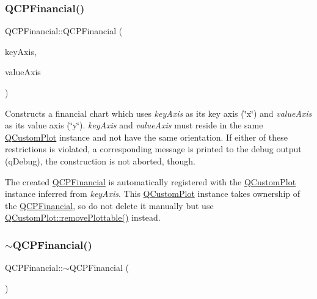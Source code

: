 \subsubsection{\texorpdfstring{Q\+C\+P\+Financial()}{QCPFinancial()}}
{\footnotesize\ttfamily Q\+C\+P\+Financial\+::\+Q\+C\+P\+Financial (\begin{DoxyParamCaption}\item[{\hyperlink{class_q_c_p_axis}{Q\+C\+P\+Axis} $\ast$}]{key\+Axis,  }\item[{\hyperlink{class_q_c_p_axis}{Q\+C\+P\+Axis} $\ast$}]{value\+Axis }\end{DoxyParamCaption})\hspace{0.3cm}{\ttfamily [explicit]}}

Constructs a financial chart which uses {\itshape key\+Axis} as its key axis (\char`\"{}x\char`\"{}) and {\itshape value\+Axis} as its value axis (\char`\"{}y\char`\"{}). {\itshape key\+Axis} and {\itshape value\+Axis} must reside in the same \hyperlink{class_q_custom_plot}{Q\+Custom\+Plot} instance and not have the same orientation. If either of these restrictions is violated, a corresponding message is printed to the debug output (q\+Debug), the construction is not aborted, though.

The created \hyperlink{class_q_c_p_financial}{Q\+C\+P\+Financial} is automatically registered with the \hyperlink{class_q_custom_plot}{Q\+Custom\+Plot} instance inferred from {\itshape key\+Axis}. This \hyperlink{class_q_custom_plot}{Q\+Custom\+Plot} instance takes ownership of the \hyperlink{class_q_c_p_financial}{Q\+C\+P\+Financial}, so do not delete it manually but use \hyperlink{class_q_custom_plot_af3dafd56884208474f311d6226513ab2}{Q\+Custom\+Plot\+::remove\+Plottable()} instead. \mbox{\label{class_q_c_p_financial_ad1fda0d793797b66819fac4682b10f31}} 
\subsubsection{\texorpdfstring{$\sim$\+Q\+C\+P\+Financial()}{~QCPFinancial()}}
{\footnotesize\ttfamily Q\+C\+P\+Financial\+::$\sim$\+Q\+C\+P\+Financial (\begin{DoxyParamCaption}{ }\end{DoxyParamCaption})\hspace{0.3cm}{\ttfamily [virtual]}}



